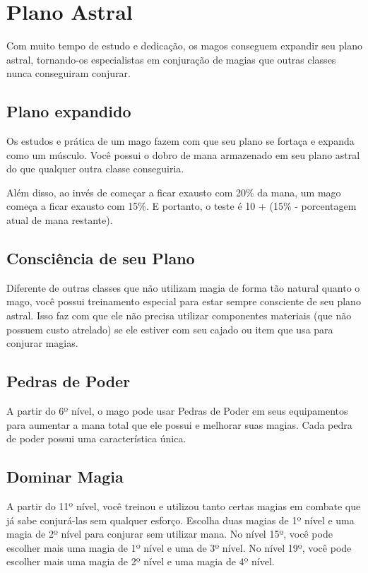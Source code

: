 \documentclass{RPG_Adventure}[2021/10/20]
\begin{document}
\section*{Plano Astral}%

Com muito tempo de estudo e dedicação, os magos conseguem expandir seu plano
astral, tornando-os especialistas em conjuração de magias que outras classes
nunca conseguiram conjurar.

\subsection*{Plano expandido}%
\label{sub:plano_expandido}

Os estudos e prática de um mago fazem com que seu plano se fortaça e expanda
como um músculo. Você possui o dobro de mana armazenado em seu plano astral do
que qualquer outra classe conseguiria.

Além disso, ao invés de começar a ficar exausto com 20\% da mana, um mago
começa a ficar exausto com 15\%. E portanto, o teste é 10 + (15\% - porcentagem
atual de mana restante).


\subsection*{Consciência de seu Plano}%
\label{sub:consciencia_de_seu_plano}

Diferente de outras classes que não utilizam magia de forma tão natural quanto o
mago, você possui treinamento especial para estar sempre consciente de seu
plano astral.
Isso faz com que ele não precisa utilizar componentes materiais (que não possuem
custo atrelado) se ele estiver com seu cajado ou item que usa para conjurar
magias.

\subsection*{Pedras de Poder}%
\label{sub:pedras_de_poder}

A partir do 6º nível, o mago pode usar Pedras de Poder em seus equipamentos para
aumentar a mana total que ele possui e melhorar suas magias. Cada pedra de poder
possui uma característica única.

\subsection*{Dominar Magia}%
\label{sub:dominar_magia}

A partir do 11º nível, você treinou e utilizou tanto certas magias em combate
que já sabe conjurá-las sem qualquer esforço. Escolha duas magias de 1º nível e
uma magia de 2º nível para conjurar sem utilizar mana. No nível 15º, você pode
escolher mais uma magia de 1º nível e uma de 3º nível. No nível 19º, você pode
escolher mais uma magia de 2º nível e uma magia de 4º nível.
\end{document}
